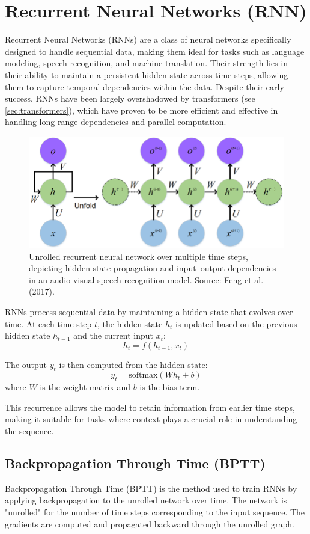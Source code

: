 \documentclass{article}
\begin{document}
\clearpage\newpage

\section{Recurrent Neural Networks (RNN)}

Recurrent Neural Networks (RNNs) are a class of neural networks specifically designed to handle sequential data, making them ideal for tasks such as language modeling, speech recognition, and machine translation. Their strength lies in their ability to maintain a persistent hidden state across time steps, allowing them to capture temporal dependencies within the data. Despite their early success, RNNs have been largely overshadowed by transformers (see \ref{sec:transformers}), which have proven to be more efficient and effective in handling long-range dependencies and parallel computation.

\begin{figure}[ht]
    \centering
    \includegraphics[width=0.6\linewidth]{graphics/S6RNN/rnn-unrolledrnn.png}
    \caption{Unrolled recurrent neural network over multiple time steps, depicting hidden state propagation and input–output dependencies in an audio‑visual speech recognition model. Source: Feng et al. (2017).}
    \label{fig:unrolled-rnn}
\end{figure}

RNNs process sequential data by maintaining a hidden state that evolves over time. At each time step \(t\), the hidden state \(h_t\) is updated based on the previous hidden state \(h_{t-1}\) and the current input \(x_t\):
\[
h_t = f(h_{t-1}, x_t)
\]

The output \(y_t\) is then computed from the hidden state:
\[
y_t = \text{softmax}(W h_t + b)
\]
where \(W\) is the weight matrix and \(b\) is the bias term. 

This recurrence allows the model to retain information from earlier time steps, making it suitable for tasks where context plays a crucial role in understanding the sequence.

\subsection{Backpropagation Through Time (BPTT)}
Backpropagation Through Time (BPTT) is the method used to train RNNs by applying backpropagation to the unrolled network over time. The network is "unrolled" for the number of time steps corresponding to the input sequence. The gradients are computed and propagated backward through the unrolled graph.
\end{document}
